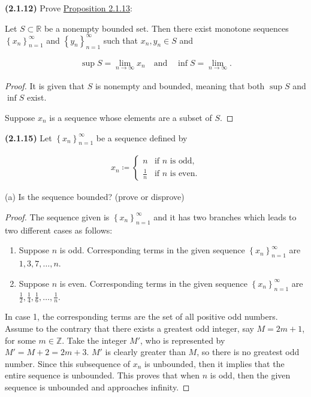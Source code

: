 \documentclass[12pt]{article}
\newcommand{\set}[1]{\left\{ {#1} \right\}}
\newcommand{\seq}[1]{\set{ {#1} }_{n=1}^\infty}
\newcommand{\bR}{\mathbb{R}}
\newcommand{\bZ}{\mathbb{Z}}
\begin{document}
\newpage

\noindent \textbf{(2.1.12)} Prove \underline{Proposition 2.1.13}:

\indent Let $S\subset\bR$ be a nonempty bounded set. Then there exist monotone sequences $\set{x_n}_{n=1}^\infty$ and $\set{y_n}_{n=1}^\infty $ such that $x_n, y_n\in S$ and

\begin{align*}
	\sup S = \lim_{n\to\infty} x_n \quad \text{and} \quad \inf S = \lim_{n\to\infty}.
\end{align*}

\begin{proof}
	It is given that $S$ is nonempty and bounded, meaning that both $\sup S$ and $\inf S$ exist.

\indent Suppose $x_n$ is a sequence whose elements are a subset of $S$. 
\end{proof}

\newpage

\noindent \textbf{(2.1.15)} Let $\set{x_n}_{n=1}^\infty$ be a sequence defined by

\begin{align*}
	x_n\coloneq \begin{cases}
             n & \text{if } n \text{ is odd}, \\
             \frac{1}{n} & \text{if } n \text{ is even}.
        		\end{cases}
\end{align*}

\noindent (a) Is the sequence bounded? (prove or disprove)

\begin{proof} The sequence given is $\seq{x_n}$ and it has two branches which leads to two different cases as follows:
	\begin{enumerate}
		\item Suppose $n$ is odd. Corresponding terms in the given sequence $\seq{x_n}$ are $1,3,7,\dots,n$.
		\item Suppose $n$ is even. Corresponding terms in the given sequence $\seq{x_n}$ are $\frac{1}{2}, \frac{1}{4}, \frac{1}{6},\dots, \frac{1}{n}$.
	\end{enumerate}
	In case 1, the corresponding terms are the set of all positive odd numbers. Assume to the contrary that there exists a greatest odd integer, say $M=2m+1$, for some $m\in\bZ$. Take the integer $M'$, who is represented by $M'=M+2=2m+3$. $M'$ is clearly greater than $M$, so there is no greatest odd number. Since this subsequence of $x_n$ is unbounded, then it implies that the entire sequence is unbounded. This proves that when $n$ is odd, then the given sequence is unbounded and approaches infinity.
\end{proof}
\end{document}
